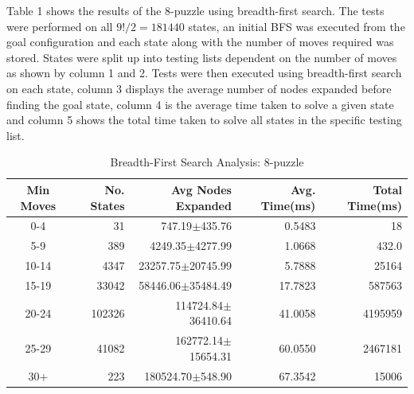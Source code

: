 \documentclass[final]{cmpreport}
\begin{document}
Table 1 shows the results of the 8-puzzle using breadth-first search. The tests were performed on all $9!/2=181440$ states, an initial BFS was executed from the goal configuration and each state along with the number of moves required was stored. States were split up into testing lists dependent on the number of moves as shown by column 1 and 2. Tests were then executed using breadth-first search on each state, column 3 displays the average number of nodes expanded before finding the goal state, column 4 is the average time taken to solve a given state and column 5 shows the total time taken to solve all states in the specific testing list.
\begin{table}[ht]
	\caption{Breadth-First Search Analysis: 8-puzzle}
	\begin{center}
		\begin{tabular}{crrrr} \hline
			Min Moves & No. States & Avg Nodes Expanded & Avg. Time(ms) & Total Time(ms) \\ \hline
			0-4  & 31 & 747.19$\pm$435.76 & 0.5483 & 18 \\
			5-9 & 389 &4249.35$\pm$4277.99& 1.0668 & 432.0 \\ 
		    10-14 & 4347 &  23257.75$\pm$20745.99& 5.7888 & 25164  \\ 
	    	15-19 & 33042& 58446.06$\pm$35484.49 & 17.7823 & 587563 \\ 
	    	20-24 & 102326& 114724.84$\pm$36410.64 & 41.0058 & 4195959  \\ 
	    	25-29 & 41082& 162772.14$\pm$15654.31 & 60.0550 & 2467181 \\ 
		    30+ & 223& 180524.70$\pm$548.90 & 67.3542 & 15006\\ \hline
		\end{tabular}
	\end{center}
\end{table}
\end{document}
